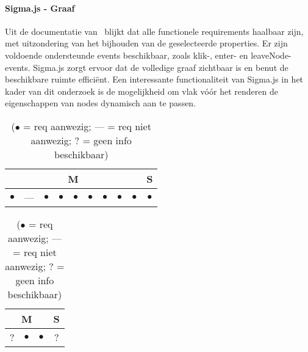 \paragraph{Sigma.js - Graaf}
Uit de documentatie van~\textcite{SigmaJS2025} blijkt dat alle functionele requirements haalbaar zijn, met uitzondering van het bijhouden van de geselecteerde properties. Er zijn voldoende ondersteunde events beschikbaar, zoals klik-, enter- en leaveNode-events. Sigma.js zorgt ervoor dat de volledige graaf zichtbaar is en benut de beschikbare ruimte efficiënt. Een interessante functionaliteit van Sigma.js in het kader van dit onderzoek is de mogelijkheid om vlak vóór het renderen de eigenschappen van nodes dynamisch aan te passen.

\begin{table}[htbp]
    \centering
    \begin{minipage}{0.48\textwidth}
        \centering
        \begin{tabular}{|ccccccccc|c|}
            \hline
            \multicolumn{9}{|c|}{M} & \multicolumn{1}{c|}{S} \\
            \midrule
            $\bullet$ & --- & $\bullet$ & $\bullet$ & $\bullet$ & $\bullet$ & $\bullet$ & $\bullet$ & $\bullet$ & $\bullet$ \\
            \bottomrule
        \end{tabular}
        \caption{Sigma.js - Functionele requirements}
    \end{minipage}
    \hfill
    \begin{minipage}{0.48\textwidth}
        \centering
        \begin{tabular}{|ccc|c|}
            \hline
            \multicolumn{3}{|c|}{M} & \multicolumn{1}{c|}{S} \\
            \midrule
            ? & $\bullet$ & $\bullet$ & ? \\
            \bottomrule
        \end{tabular}
        \caption{Sigma.js - Niet-functionele requirements}
    \end{minipage}
    \caption*{($\bullet$ = req aanwezig; --- = req niet aanwezig; ? = geen info beschikbaar)}
\end{table}

